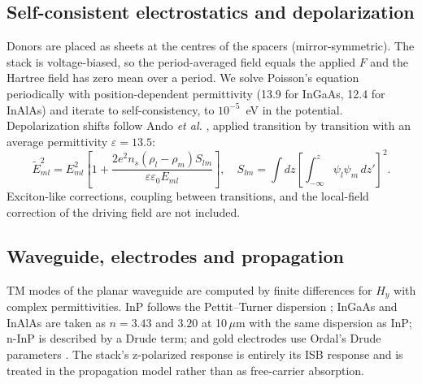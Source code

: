 \documentclass[11pt]{article}
\newcommand{\um}{\,\mu\mathrm{m}}
\begin{document}
\subsection{Self-consistent electrostatics and depolarization}\label{sec:sc}
Donors are placed as sheets at the centres of the spacers (mirror-symmetric). The stack is voltage-biased, so the period-averaged field equals the applied $F$ and the Hartree field has zero mean over a period. We solve Poisson's equation periodically with position-dependent permittivity (13.9 for InGaAs, 12.4 for InAlAs) and iterate to self-consistency, to $10^{-5}$~eV in the potential. Depolarization shifts follow Ando \emph{et al.} \cite{Ando1982}, applied transition by transition with an average permittivity $\varepsilon=13.5$:
\begin{equation}
\tilde E_{ml}^2=E_{ml}^2\left[1+\frac{2e^2n_s(\rho_l-\rho_m)S_{lm}}{\varepsilon\varepsilon_0E_{ml}}\right],\quad S_{lm}=\int dz\left[\int_{-\infty}^{z}\psi_l\psi_m\,dz'\right]^2 .
\end{equation}
Exciton-like corrections, coupling between transitions, and the local-field correction of the driving field \cite{Zaluzny1995,Heyman1994} are not included.

\subsection{Waveguide, electrodes and propagation}\label{sec:wgmodel}
TM modes of the planar waveguide are computed by finite differences for $H_y$ with complex permittivities. InP follows the Pettit--Turner dispersion \cite{Pettit1965}; InGaAs and InAlAs are taken as $n=3.43$ and $3.20$ at 10$\um$ with the same dispersion as InP; n-InP is described by a Drude term; and gold electrodes use Ordal's Drude parameters \cite{Ordal1985}. The stack's z-polarized response is entirely its ISB response and is treated in the propagation model rather than as free-carrier absorption.
\end{document}
